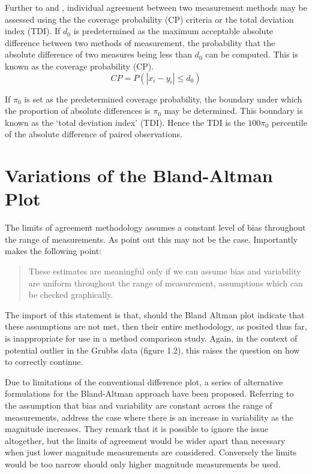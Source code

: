 \documentclass[12pt, a4paper]{report}
\theoremstyle{plain}
\theoremstyle{definition}
\theoremstyle{remark}
\begin{document}
Further to  \citet{lin2000} and \citet{lin2002}, individual agreement between two measurement methods may be
assessed using the the coverage probability (CP) criteria or the total deviation index (TDI). If $d_{0}$ is predetermined as the maximum acceptable absolute difference between two methods of measurement, the probability that the absolute difference of two measures being less than $d_{0}$ can be computed. This is known as the coverage probability (CP).
\begin{equation}
CP = P(|x_{i} - y_{i}| \leq d_{0})
\end{equation}

If $\pi_{0}$ is set as the predetermined coverage probability, the
boundary under which the proportion of absolute differences is
$\pi_{0}$ may be determined. This boundary is known as the `total
deviation index' (TDI). Hence the TDI is the $100\pi_{0}$
percentile of the absolute difference of paired observations.

\section{Variations of the Bland-Altman Plot} 
The limits of agreement methodology assumes a constant level of bias throughout the range of measurements. As \citet*{BA86} point out this may not be the case. 
Importantly \citet{BA99} makes the following point:
\begin{quote}These estimates are meaningful only if we can assume
	bias and variability are uniform throughout the range of
	measurement, assumptions which can be checked graphically.
\end{quote}

The import of this statement is that, should the Bland Altman plot indicate that these assumptions are not met, then their
entire methodology, as posited thus far, is inappropriate for use
in a method comparison study. Again, in the context of potential
outlier in the Grubbs data (figure 1.2), this raises the question
on how to correctly continue. 

Due to limitations of the conventional difference plot, a series of alternative formulations for the Bland-Altman approach have been proposed. Referring to the assumption that bias and variability are constant across the range of measurements, \citet{BA99} address the case where there is an increase in variability as the magnitude increases. They remark that it is possible to ignore the issue altogether, but the limits of agreement would be wider apart than necessary when just lower magnitude measurements are considered. Conversely the limits would be too narrow should only higher magnitude measurements be used. 
\end{document}
